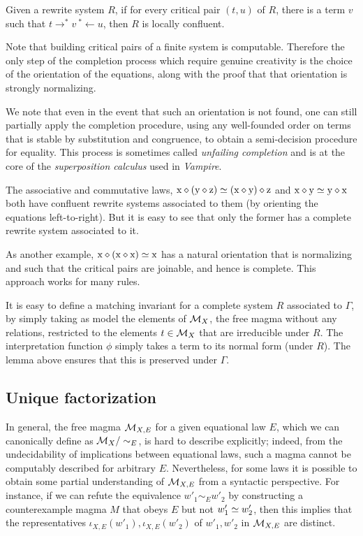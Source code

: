 \begin{theorem}
  Given a rewrite system $R$, if for every critical pair $(t, u)$ of $R$, there is a term $v$ such that $t\rightarrow^* v\ {}^*\leftarrow u$, then $R$ is locally confluent.
\end{theorem}

Note that building critical pairs of a finite system is computable. Therefore the only step of the completion process which require genuine creativity is the choice of the orientation of the equations, along with the proof that that orientation is strongly normalizing.

We note that even in the event that such an orientation is not found, one can still partially apply the completion procedure, using any well-founded order on terms that is stable by substitution and congruence, to obtain a semi-decision procedure for equality. This process is sometimes called \emph{unfailing completion} and is at the core of the \emph{superposition calculus} used in \emph{Vampire}.

The associative and commutative laws, $\mathrm{x} \diamond (\mathrm{y} \diamond \mathrm{z}) \simeq (\mathrm{x} \diamond \mathrm{y}) \diamond \mathrm{z}$ and $\mathrm{x} \diamond \mathrm{y} \simeq \mathrm{y} \diamond \mathrm{x}$ both have confluent rewrite systems associated to them (by orienting the equations left-to-right). But it is easy to see that only the former has a complete rewrite system associated to it.

As another example, $\mathrm{x} \diamond (\mathrm{x} \diamond \mathrm{x}) \simeq \mathrm{x}$ has a natural orientation that is normalizing and such that the critical pairs are joinable, and hence is complete. This approach works for many rules.

It is easy to define a matching invariant for a complete system $R$ associated to $\Gamma$, by simply taking as model the elements of ${\mathcal{M}}_{X}$, the free magma without any relations, restricted to the elements $t \in {\mathcal{M}}_{X}$ that are irreducible under $R$. The interpretation function $\phi$ simply takes a term to its normal form (under $R$). The lemma above ensures that this is preserved under $\Gamma$.

\subsection{Unique factorization}

In general, the free magma ${\mathcal{M}}_{X,E}$ for a given equational law $E$, which we can canonically define as ${\mathcal{M}}_X / \sim_E$, is hard to describe explicitly; indeed, from the undecidability of implications between equational laws, such a magma cannot be computably described for arbitrary $E$.  Nevertheless, for some laws it is possible to obtain some partial understanding of ${\mathcal{M}}_{X,E}$ from a syntactic perspective.  For instance, if we can refute the equivalence $w'_1 \sim_E w'_2$ by constructing a counterexample magma $M$ that obeys $E$ but not $w'_1 \simeq w'_2$, then this implies that the representatives $\iota_{X,E}(w'_1), \iota_{X,E}(w'_2)$ of  $w'_1, w'_2$ in ${\mathcal{M}}_{X,E}$ are distinct.

